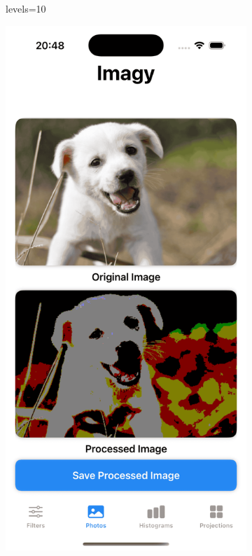 \documentclass[a4paper]{article}
\begin{document}
\begin{figure}[H]
\begin{subfigure}{0.2\textwidth}
        \caption{levels=10}
        \label{fig:dog_posterize_10}
    \end{subfigure}
    \hfill
    \begin{subfigure}{0.2\textwidth}
        \centering
        \includegraphics[width=\linewidth]{images/dog_posterize_128.png}

\end{subfigure}
\end{figure}
\end{document}
